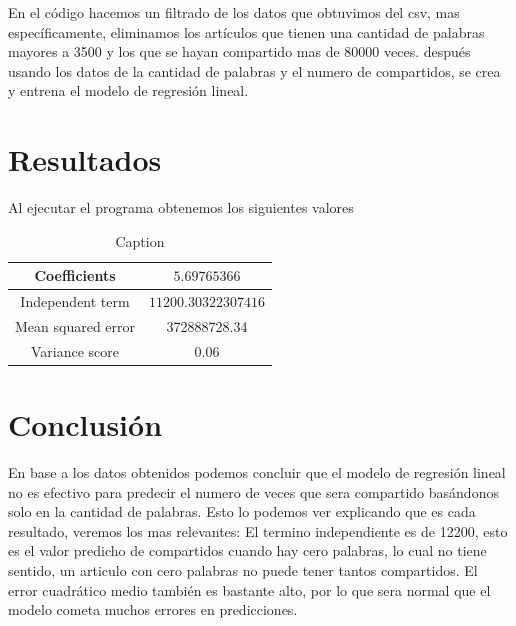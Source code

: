 En el código hacemos un filtrado de los datos que obtuvimos del csv, mas específicamente, eliminamos los artículos que tienen una cantidad de palabras mayores a 3500 y los que se hayan compartido mas de 80000 veces. después usando los datos de la cantidad de palabras y el numero de compartidos, se crea y entrena el modelo de regresión lineal.


\section{Resultados}

Al ejecutar el programa obtenemos los siguientes valores

\begin{table}[h]
    \centering
    \begin{tabular}{|c|c|} \hline 
        Coefficients & $5.69765366$ \\ \hline 
        Independent term & $11200.30322307416$\\ \hline 
        Mean squared error & 372888728.34\\ \hline 
        Variance score & 0.06 \\ \hline
    \end{tabular}
    \caption{Caption}
    \label{tab:my_label}
\end{table}


\section{Conclusión}
En base a los datos obtenidos podemos concluir que el modelo de regresión lineal no es efectivo para predecir el numero de veces que sera compartido basándonos solo en la cantidad de palabras.
Esto lo podemos ver explicando que es cada resultado, veremos los mas relevantes:
El termino independiente es de 12200, esto es el valor predicho de compartidos cuando hay cero palabras, lo cual no tiene sentido, un articulo con cero palabras no puede tener tantos compartidos. 
El error cuadrático medio también es bastante alto, por lo que sera normal que el modelo cometa muchos errores en predicciones.